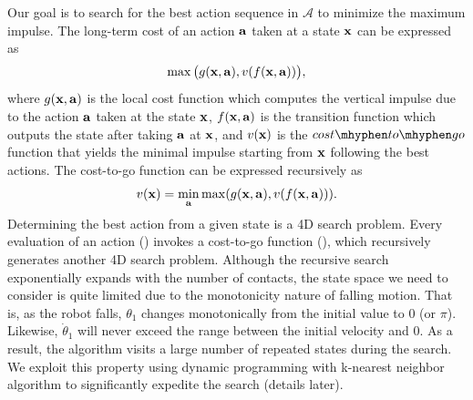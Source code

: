 
Our goal is to search for the best action sequence in $\mathcal{A}$ to
minimize the maximum impulse. The long-term cost of an action $\mathbf{a}$
taken at a state $\mathbf{x}$ can be expressed as
\begin{equation}
\max\big(g(\mathbf{x}, \mathbf{a}), v(f(\mathbf{x}, \mathbf{a}))\big),
\label{eq:falling_actionEval}
\end{equation}
where $g(\mathbf{x}, \mathbf{a})$ is the local cost function which computes
the vertical impulse due to the action $\mathbf{a}$ taken at the state
$\mathbf{x}$, $f(\mathbf{x}, \mathbf{a})$ is the transition function which outputs
the state after taking $\mathbf{a}$ at $\mathbf{x}$, and $v(\mathbf{x})$ is
the $cost \mhyphen to \mhyphen go$ function that yields the minimal impulse starting from
$\mathbf{x}$ following the best actions. The cost-to-go function can be
expressed recursively as
\begin{equation}
v(\mathbf{x}) = \min_{\mathbf{a}} \max(g(\mathbf{x}, \mathbf{a}), v(f(\mathbf{x}, \mathbf{a}))).
\label{eq:falling_cost-to-go}
\end{equation}
Determining the best action from a given state is a 4D search
problem. Every evaluation of an action () invokes a
cost-to-go function (), which recursively generates
another 4D search problem. Although the recursive
search exponentially expands with the number of contacts, the state
space we need to consider is quite limited due to the monotonicity
nature of falling motion. That is, as the robot falls, $\theta_1$
changes monotonically from the initial value to $0$ (or
$\pi$). Likewise, $\dot{\theta}_1$ will never exceed the range between
the initial velocity and $0$. As a result, the algorithm visits a
large number of repeated states during the search. We exploit this
property using dynamic programming with k-nearest neighbor algorithm
to significantly expedite the search (details later).


